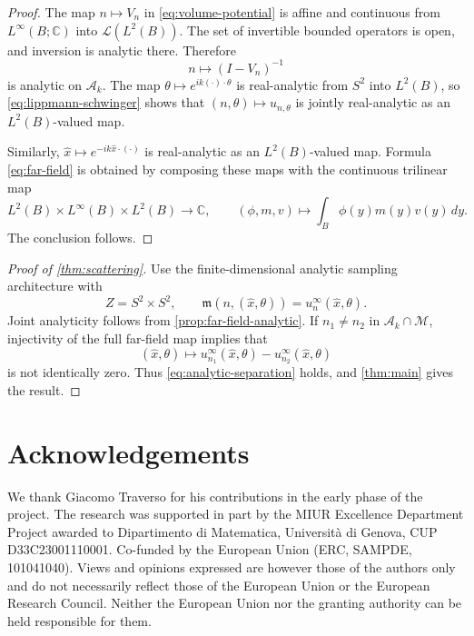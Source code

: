 \documentclass[11pt,oneside]{amsart}
\theoremstyle{plain}
\newtheorem{proposition}[theorem]{Proposition}
\theoremstyle{definition}
\theoremstyle{remark}
\newcommand{\CC}{\mathbb{C}}
\newcommand{\calL}{\mathcal{L}}
\newcommand{\calM}{\mathcal{M}}
\begin{document}

\begin{proof}
The map $n\mapsto V_n$ in \eqref{eq:volume-potential} is affine and continuous from $L^\infty(B;\CC)$ into $\calL(L^2(B))$. The set of invertible bounded operators is open, and inversion is analytic there. Therefore
\[
    n\longmapsto (I-V_n)^{-1}
\]
is analytic on $\mathcal A_k$. The map $\theta\mapsto e^{ik(\cdot)\cdot\theta}$ is real-analytic from $S^2$ into $L^2(B)$, so \eqref{eq:lippmann-schwinger} shows that $(n,\theta)\mapsto u_{n,\theta}$ is jointly real-analytic as an $L^2(B)$-valued map.

Similarly, $\widehat x\mapsto e^{-ik\widehat x\cdot(\cdot)}$ is real-analytic as an $L^2(B)$-valued map. Formula \eqref{eq:far-field} is obtained by composing these maps with the continuous trilinear map
\[
    L^2(B)\times L^\infty(B)\times L^2(B)\to\CC,\qquad(\phi,m,v)\longmapsto\int_B\phi(y)m(y)v(y)\,dy.
\]
The conclusion follows.
\end{proof}

\begin{proof}[Proof of \cref{thm:scattering}]
Use the finite-dimensional analytic sampling architecture with
\[
    Z=S^2\times S^2,
    \qquad
    \mathfrak m(n,(\widehat x,\theta))=u_n^\infty(\widehat x,\theta).
\]
Joint analyticity follows from \cref{prop:far-field-analytic}. If $n_1\neq n_2$ in $\mathcal A_k\cap\calM$, injectivity of the full far-field map implies that
\[
    (\widehat x,\theta)\longmapsto
    u_{n_1}^\infty(\widehat x,\theta)-u_{n_2}^\infty(\widehat x,\theta)
\]
is not identically zero. Thus \eqref{eq:analytic-separation} holds, and \cref{thm:main} gives the result.
\end{proof}

\section*{Acknowledgements}
We thank Giacomo Traverso for his contributions in the early phase of the project. The research was supported in part by the MIUR Excellence Department Project awarded to Dipartimento di Matematica, Università di Genova, CUP D33C23001110001. Co-funded by the European Union (ERC, SAMPDE, 101041040). Views and opinions expressed are however those of the authors only and do not necessarily reflect those of the European Union or the European Research Council. Neither the European Union nor the granting authority can be held responsible for them.




\end{document}
